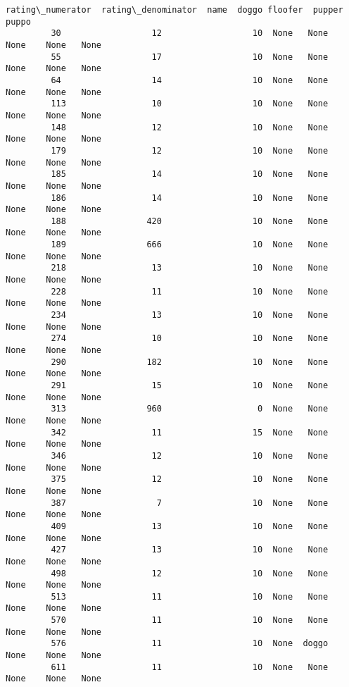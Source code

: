 \documentclass[11pt]{article}
\begin{document}
\begin{Verbatim}[commandchars=\\\{\}]
               rating\_numerator  rating\_denominator  name  doggo floofer  pupper  puppo  
         30                  12                  10  None   None    None    None   None  
         55                  17                  10  None   None    None    None   None  
         64                  14                  10  None   None    None    None   None  
         113                 10                  10  None   None    None    None   None  
         148                 12                  10  None   None    None    None   None  
         179                 12                  10  None   None    None    None   None  
         185                 14                  10  None   None    None    None   None  
         186                 14                  10  None   None    None    None   None  
         188                420                  10  None   None    None    None   None  
         189                666                  10  None   None    None    None   None  
         218                 13                  10  None   None    None    None   None  
         228                 11                  10  None   None    None    None   None  
         234                 13                  10  None   None    None    None   None  
         274                 10                  10  None   None    None    None   None  
         290                182                  10  None   None    None    None   None  
         291                 15                  10  None   None    None    None   None  
         313                960                   0  None   None    None    None   None  
         342                 11                  15  None   None    None    None   None  
         346                 12                  10  None   None    None    None   None  
         375                 12                  10  None   None    None    None   None  
         387                  7                  10  None   None    None    None   None  
         409                 13                  10  None   None    None    None   None  
         427                 13                  10  None   None    None    None   None  
         498                 12                  10  None   None    None    None   None  
         513                 11                  10  None   None    None    None   None  
         570                 11                  10  None   None    None    None   None  
         576                 11                  10  None  doggo    None    None   None  
         611                 11                  10  None   None    None    None   None  

\end{Verbatim}
\end{document}
